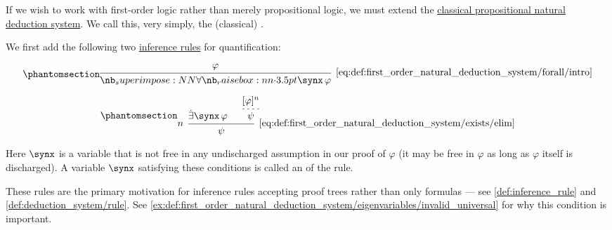 \begin{definition}\label{def:first_order_natural_deduction_system}
  If we wish to work with first-order logic rather than merely propositional logic, we must extend the \hyperref[def:propositional_natural_deduction_systems]{classical propositional natural deduction system}. We call this, very simply, the (classical) .

  \begin{thmenum}
     We first add the following two \hyperref[def:inference_rule]{inference rules} for quantification:

    \begin{minipage}{0.45\textwidth}
      \begin{equation*}\taglabel[\ensuremath{ \synforall_+ }]{eq:def:first_order_natural_deduction_system/forall/intro}
        \begin{prooftree}
          \hypo{ \varphi }
          \infer1[\ref{eq:def:first_order_natural_deduction_system/forall/intro}]{ \qforall \synx \varphi }
        \end{prooftree}
      \end{equation*}
    \end{minipage}
    \hfill
    \begin{minipage}{0.45\textwidth}
      \begin{equation*}\taglabel[\ensuremath{ \synexists_- }]{eq:def:first_order_natural_deduction_system/exists/elim}
        \begin{prooftree}
          \hypo{ \qexists \synx \varphi }
          \hypo{ [\varphi]^n }
          \infer[dashed]1{ \psi }
          \infer[left label=\( n \)]2[\ref{eq:def:first_order_natural_deduction_system/exists/elim}]{ \psi }
        \end{prooftree}
      \end{equation*}
    \end{minipage}

    Here \( \synx \) is a variable that is not free in any undischarged assumption in our proof of \( \varphi \) (it may be free in \( \varphi \) as long as \( \varphi \) itself is discharged). A variable \( \synx \) satisfying these conditions is called an  of the rule.

    These rules are the primary motivation for inference rules accepting proof trees rather than only formulas --- see \cref{def:inference_rule} and \cref{def:deduction_system/rule}. See \cref{ex:def:first_order_natural_deduction_system/eigenvariables/invalid_universal} for why this condition is important.


\end{thmenum}
\end{definition}
